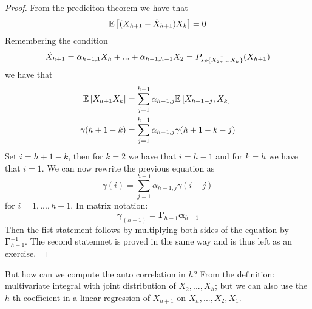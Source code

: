 \begin{proof}
    From the prediciton theorem we have that
    \[
        \mathbb{E}\left[(X_{h+1}-\tilde{X}_{h+1})X_k\right]=0  
    \]
    Remembering the condition
    \[
        \tilde{X}_{h+1}=\alpha_{h-1,1}X_h+...+\alpha_{h-1,h-1}X_2=P_{\bar{sp\left\{X_2,...,X_h\right\}}}(X_{h+1})
    \]
    we have that
    \begin{equation*}
        \begin{split}
            \mathbb{E}\left[X_{h+1}X_k\right]&=\sum_{j=1}^{h-1}\alpha_{h-1,j}\mathbb{E}\left[X_{h+1-j},X_k\right]\\
            \gamma(h+1-k)&=\sum_{j=1}^{h-1}\alpha_{h-1,j}\gamma(h+1-k-j)\\
        \end{split}
    \end{equation*}
    Set $i=h+1-k$, then for $k=2$ we have that $i=h-1$ and for $k=h$ we have that $i=1$. We can now rewrite the previous equation as
    \[
        \gamma(i)=\sum_{j=1}^{h-1}\alpha_{h-1,j}\gamma(i-j)
    \]
    for $i=1,...,h-1$. In matrix notation:
    \[
        \boldsymbol{\gamma}_{(h-1)}=\boldsymbol{\Gamma}_{h-1}\boldsymbol{\alpha}_{h-1}
    \]
    Then the fist statement follows by multiplying both sides of the equation by $\boldsymbol{\Gamma}_{h-1}^{-1}$. The second statemnet is proved in the same way and is thus left as an exercise.
\end{proof}

But how can we compute the auto correlation in $h$? From the definition: multivariate integral with joint distribution of $X_2,...,X_h$; but we can also use the $h$-th coefficient in a linear regression of $X_{h+1}$ on $X_h,...,X_2,X_1$.

